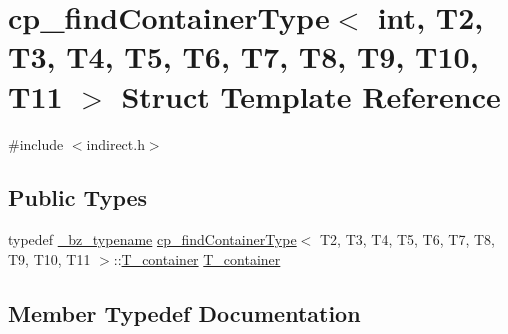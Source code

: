 \hypertarget{structcp__findContainerType_3_01int_00_01T2_00_01T3_00_01T4_00_01T5_00_01T6_00_01T7_00_01T8_00_01T9_00_01T10_00_01T11_01_4}{}\section{cp\+\_\+find\+Container\+Type$<$ int, T2, T3, T4, T5, T6, T7, T8, T9, T10, T11 $>$ Struct Template Reference}
\label{structcp__findContainerType_3_01int_00_01T2_00_01T3_00_01T4_00_01T5_00_01T6_00_01T7_00_01T8_00_01T9_00_01T10_00_01T11_01_4}


{\ttfamily \#include $<$indirect.\+h$>$}

\subsection*{Public Types}
\begin{DoxyCompactItemize}
\item 
typedef \hyperlink{compiler_8h_a1bc40add3e72effc9cf69dbe445cbdfd}{\+\_\+bz\+\_\+typename} \hyperlink{structcp__findContainerType}{cp\+\_\+find\+Container\+Type}$<$ T2, T3, T4, T5, T6, T7, T8, T9, T10, T11 $>$\+::\hyperlink{structcp__findContainerType_3_01int_00_01T2_00_01T3_00_01T4_00_01T5_00_01T6_00_01T7_00_01T8_00_01T9_00_01T10_00_01T11_01_4_a237316b3c2e3063068f6dc36d31b8b5b}{T\+\_\+container} \hyperlink{structcp__findContainerType_3_01int_00_01T2_00_01T3_00_01T4_00_01T5_00_01T6_00_01T7_00_01T8_00_01T9_00_01T10_00_01T11_01_4_a237316b3c2e3063068f6dc36d31b8b5b}{T\+\_\+container}
\end{DoxyCompactItemize}


\subsection{Member Typedef Documentation}
\hypertarget{structcp__findContainerType_3_01int_00_01T2_00_01T3_00_01T4_00_01T5_00_01T6_00_01T7_00_01T8_00_01T9_00_01T10_00_01T11_01_4_a237316b3c2e3063068f6dc36d31b8b5b}{}
